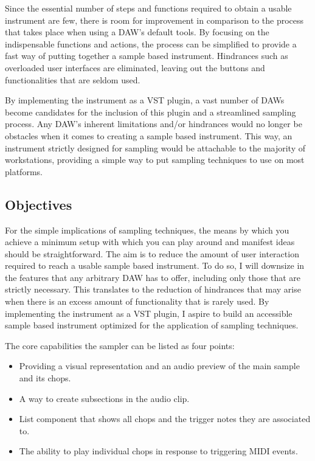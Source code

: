 \documentclass[12pt, a4paper, hidelinks]{article}
\begin{document}
	Since the essential number of steps and functions required to obtain a usable instrument are few, there is room for improvement in comparison to the process that takes place when using a DAW's default tools. By focusing on the indispensable functions and actions, the process can be simplified to provide a fast way of putting together a sample based instrument. Hindrances such as overloaded user interfaces are eliminated, leaving out the buttons and functionalities that are seldom used. \par
	
	By implementing the instrument as a VST plugin, a vast number of DAWs become candidates for the inclusion of this plugin and a streamlined sampling process. Any DAW's inherent limitations and/or hindrances would no longer be obstacles when it comes to creating a sample based instrument. This way, an instrument strictly designed for sampling would be attachable to the majority of workstations, providing a simple way to put sampling techniques to use on most platforms.
	  

	
	
	\newpage
	\subsection{Objectives}
	For the simple implications of sampling techniques, the means by which you achieve a minimum setup with which you can play around and manifest ideas should be straightforward. The aim is to reduce the amount of user interaction required to reach a usable sample based instrument. To do so, I will downsize in the features that any arbitrary DAW has to offer, including only those that are strictly necessary. This translates to the reduction of hindrances that may arise when there is an excess amount of functionality that is rarely used.  By implementing the instrument as a VST plugin, I aspire to build an accessible sample based instrument optimized for the application  of sampling techniques. %
	\par
	The core capabilities the sampler can be listed as four points:
	\begin{itemize}
		\item Providing a visual representation and an audio preview of the main 
		sample and its chops.
		\item A way to create subsections in the audio clip.
		\item List component that shows all chops and the trigger notes they are associated to.
		\item The ability to play individual chops in response to triggering MIDI events.
	\end{itemize}
	
\end{document}
